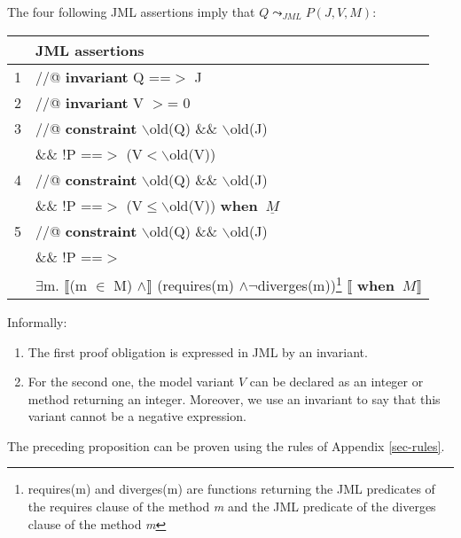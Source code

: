 \begin{proposition}\label{PropLeadsTo} The four following JML assertions imply that $Q\leadsto_{JML}P (J,V,M)$:
\begin{center}
\vline
\small{
\normalfont
\begin{tabular}{r|l}
\hline
& \textbf{JML assertions}\\
\hline
1 & //@ \textbf{invariant}  Q ==$>$ J \\
\hline
2 & //@ \textbf{invariant} V $>$= 0 \\
\hline
3 & //@ \textbf{constraint} $\backslash$old(Q) \&\& $\backslash$old(J) \\
& \&\& !P ==$>$ (V$<\backslash$old(V)) \\
\hline
4 & //@ \textbf{constraint} $\backslash$old(Q) \&\& $\backslash$old(J) \\
& \&\& !P ==$>$ (V$\leq\backslash$old(V)) \textbf{when} $~ \underline{M} $\\
\hline
5 & //@ \textbf{constraint} $\backslash$old(Q) \&\& $\backslash$old(J) \\
& \&\& !P ==$>$ \\
&  $\exists$m. $\llbracket$(m $\in$ M) $\wedge \rrbracket$ (requires(m) $\wedge \neg$diverges(m))\footnote{requires(m) and diverges(m) are functions returning the JML predicates of the requires clause of the method \textit{m} and the JML predicate of the diverges clause of the method \textit{m}  } $\llbracket$ \textbf{when} $~ M \rrbracket$ \\
\hline
\end{tabular}\vline
}
\end{center}

\end{proposition}

Informally:
\begin{enumerate}
\item The first proof obligation is expressed in JML by an invariant.
\item For the second one, the model variant $V$ can be declared as an integer or method returning an integer. Moreover, we use an invariant to say that this variant cannot be a negative expression.
\end{enumerate}

The preceding proposition can be proven using the rules of Appendix \ref{sec-rules}.



